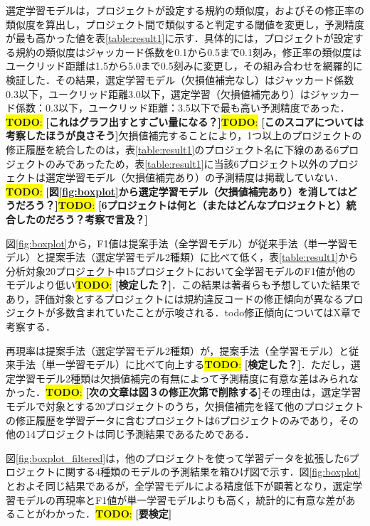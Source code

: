 \documentclass[submit]{ipsj}
\newcommand{\todo}[1]{\colorbox{yellow}{{\bf TODO}:}{\color{red} {\textbf{[#1]}}}}
\begin{document}
選定学習モデルは，プロジェクトが設定する規約の類似度，およびその修正率の類似度を算出し，プロジェクト間で類似すると判定する閾値を変更し，予測精度が最も高かった値を表\ref{table:result1}に示す．具体的には，プロジェクトが設定する規約の類似度はジャッカード係数を0.1から0.5まで0.1刻み，修正率の類似度はユークリッド距離は1.5から5.0まで0.5刻みに変更し，その組み合わせを網羅的に検証した．その結果，選定学習モデル（欠損値補完なし）はジャッカード係数0.3以下，ユークリッド距離3.0以下，選定学習（欠損値補完あり）はジャッカード係数：0.3以下，ユークリッド距離：3.5以下で最も高い予測精度であった．\todo{これはグラフ出すとすごい量になる？}\todo{このスコアについては考察したほうが良さそう}欠損値補完することにより，1つ以上のプロジェクトの修正履歴を統合したのは，表\ref{table:result1}のプロジェクト名に下線のある6プロジェクトのみであったため，表\ref{table:result1}に当該6プロジェクト以外のプロジェクトは選定学習モデル（欠損値補完あり）の予測精度は掲載していない．\todo{図\ref{fig:boxplot}から選定学習モデル（欠損値補完あり）を消してはどうだろう？}\todo{6プロジェクトは何と（またはどんなプロジェクトと）統合したのだろう？考察で言及？}

図\ref{fig:boxplot}から，F1値は提案手法（全学習モデル）が従来手法（単一学習モデル）と提案手法（選定学習モデル2種類）に比べて低く，表\ref{table:result1}から分析対象20プロジェクト中15プロジェクトにおいて全学習モデルのF1値が他のモデルより低い\todo{検定した？}．この結果は著者らも予想していた結果であり，評価対象とするプロジェクトには規約違反コードの修正傾向が異なるプロジェクトが多数含まれていたことが示唆される．todo{修正傾向についてはX章で考察する．}

再現率は提案手法（選定学習モデル2種類）が，提案手法（全学習モデル）と従来手法（単一学習モデル）に比べて向上する\todo{検定した？}．ただし，選定学習モデル2種類は欠損値補完の有無によって予測精度に有意な差はみられなかった．\todo{次の文章は図３の修正次第で削除する}その理由は，選定学習モデルで対象とする20プロジェクトのうち，欠損値補完を経て他のプロジェクトの修正履歴を学習データに含むプロジェクトは6プロジェクトのみであり，その他の14プロジェクトは同じ予測結果であるためである．

図\ref{fig:boxplot_filtered}は，他のプロジェクトを使って学習データを拡張した6プロジェクトに関する4種類のモデルの予測結果を箱ひげ図で示す．図\ref{fig:boxplot}とおよそ同じ結果であるが，全学習モデルによる精度低下が顕著となり，選定学習モデルの再現率とF1値が単一学習モデルよりも高く，統計的に有意な差があることがわかった．\todo{要検定}

\end{document}
